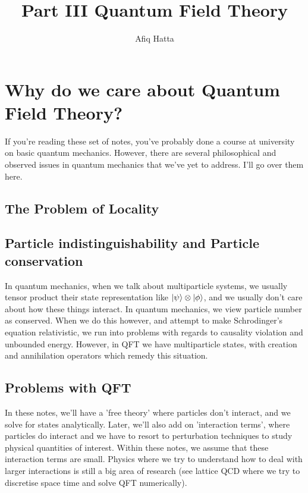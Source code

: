 \documentclass[11pt, oneside]{article}   	%
\title{Part III Quantum Field Theory}
\author{Afiq Hatta }
\theoremstyle{newline}
\theoremstyle{newline}
\theoremstyle{newline}
\theoremstyle{newline}
\theoremstyle{newline}
\begin{document}
 
\maketitle
\tableofcontents


\pagebreak 

\section{Why do we care about Quantum Field Theory? } 

If you're reading these set of notes, you've probably done a course at university on basic quantum mechanics. However, there are several philosophical and observed issues in quantum mechanics that we've yet to address. I'll go over them here. 


\subsection{The Problem of Locality} 
\subsection{Particle indistinguishability and Particle conservation}
In quantum mechanics, when we talk about multiparticle systems, we usually tensor product their state representation like $\ket{\psi} \otimes \ket{\phi}$, and we usually don't care about how these things interact. In quantum mechanics, we view particle number as conserved. When we do this however, and attempt to make Schrodinger's equation relativistic, we run into problems with regards to causality violation and unbounded energy. However, in QFT we have multiparticle states, with creation and annihilation operators which remedy this situation. 

\subsection{Problems with QFT} 
In these notes, we'll have a 'free theory' where particles don't interact, and we solve for states analytically. Later, we'll also add on 'interaction terms', where particles do interact and we have to resort to perturbation techniques to study physical quantities of interest. Within these notes, we assume that these interaction terms are small. Physics where we try to understand how to deal with larger interactions is still a big area of research (see lattice QCD where we try to discretise space time and solve QFT numerically). 
\end{document}
